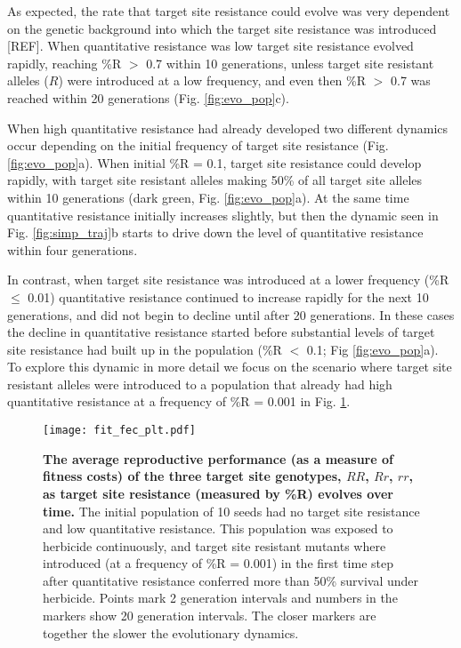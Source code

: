 \documentclass[10pt,letterpaper]{article}
\begin{document}
As expected, the rate that target site resistance could evolve was very dependent on the genetic background into which the target site resistance was introduced [REF]. When quantitative resistance was low target site resistance evolved rapidly, reaching \%R $>$ 0.7 within 10 generations, unless target site resistant alleles ($R$) were introduced at a low frequency, and even then \%R $>$ 0.7 was reached within 20 generations (Fig. \ref{fig:evo_pop}c).

When high quantitative resistance had already developed two different dynamics occur depending on the initial frequency of target site resistance (Fig. \ref{fig:evo_pop}a). When initial \%R = 0.1, target site resistance could develop rapidly, with target site resistant alleles making 50\% of all target site alleles within 10 generations (dark green, Fig. \ref{fig:evo_pop}a). At the same time quantitative resistance initially increases slightly, but then the dynamic seen in Fig. \ref{fig:simp_traj}b starts to drive down the level of quantitative resistance within four generations. 

In contrast, when target site resistance was introduced at a lower frequency (\%R $\leq$ 0.01) quantitative resistance continued to increase rapidly for the next 10 generations, and did not begin to decline until after 20 generations. In these cases the decline in quantitative resistance started before substantial levels of target site resistance had built up in the population (\%R $<$ 0.1; Fig \ref{fig:evo_pop}a). To explore this dynamic in more detail we focus on the scenario where target site resistant alleles were introduced to a population that already had high quantitative resistance at a frequency of \%R = 0.001 in Fig. \ref{fig:G_fit}. 

\begin{figure}[!h] 
	\texttt{[image: fit\_fec\_plt.pdf]}
\caption{{\bf The average reproductive performance (as a measure of fitness costs) of the three target site genotypes, $RR$, $Rr$, $rr$, as target site resistance (measured by \%R) evolves over time.} The initial population of 10 seeds had no target site resistance and low quantitative resistance. This population was exposed to herbicide continuously, and target site resistant mutants where introduced (at a frequency of \%R = 0.001) in the first time step after quantitative resistance conferred more than 50\% survival under herbicide. Points mark 2 generation intervals and numbers in the markers show 20 generation intervals. The closer markers are together the slower the evolutionary dynamics.} 
\label{fig:G_fit}
\end{figure}
\end{document}
